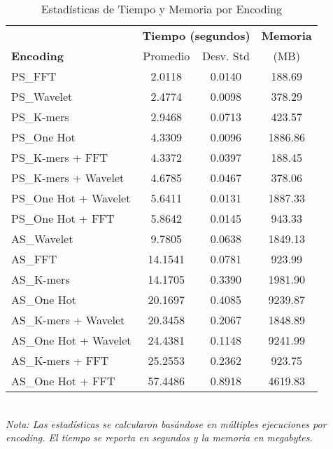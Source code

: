 \begin{table*}[htbp]
\centering
\caption{Estadísticas de Tiempo y Memoria por Encoding}
\label{tab:encoding_stats}
\scriptsize
\begin{tabular}{lccc}
\toprule
& \multicolumn{2}{c}{\textbf{Tiempo (segundos)}} & \textbf{Memoria} \\
\cmidrule(lr){2-3} \cmidrule(lr){4-4}
\textbf{Encoding} & Promedio & Desv. Std & (MB) \\
\midrule
PS\_FFT & 2.0118 & 0.0140 & 188.69 \\
PS\_Wavelet & 2.4774 & 0.0098 & 378.29 \\
PS\_K-mers & 2.9468 & 0.0713 & 423.57 \\
PS\_One Hot & 4.3309 & 0.0096 & 1886.86 \\
PS\_K-mers + FFT & 4.3372 & 0.0397 & 188.45 \\
PS\_K-mers + Wavelet & 4.6785 & 0.0467 & 378.06 \\
PS\_One Hot + Wavelet & 5.6411 & 0.0131 & 1887.33 \\
PS\_One Hot + FFT & 5.8642 & 0.0145 & 943.33 \\
AS\_Wavelet & 9.7805 & 0.0638 & 1849.13 \\
AS\_FFT & 14.1541 & 0.0781 & 923.99 \\
AS\_K-mers & 14.1705 & 0.3390 & 1981.90 \\
AS\_One Hot & 20.1697 & 0.4085 & 9239.87 \\
AS\_K-mers + Wavelet & 20.3458 & 0.2067 & 1848.89 \\
AS\_One Hot + Wavelet & 24.4381 & 0.1148 & 9241.99 \\
AS\_K-mers + FFT & 25.2553 & 0.2362 & 923.75 \\
AS\_One Hot + FFT & 57.4486 & 0.8918 & 4619.83 \\
\bottomrule
\end{tabular}
\\[0.5em]
\footnotesize
\textit{Nota: Las estadísticas se calcularon basándose en múltiples ejecuciones por encoding. El tiempo se reporta en segundos y la memoria en megabytes.}
\end{table*}